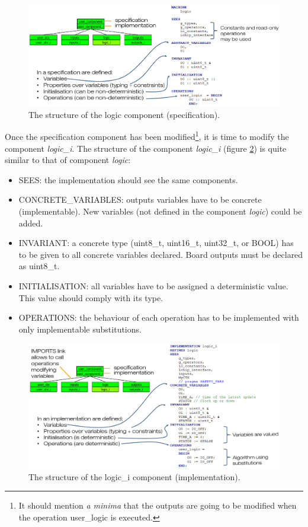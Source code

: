 \begin{figure}[ht]
\centering\includegraphics[scale=0.25]{Pictures/chapterProgramming/programming-spec.png}
\caption{The structure of the logic component (specification).}
\label{programming:spec}
\end{figure}
Once the specification component has been modified\footnote{It should mention \textit{a minima} that the outputs are going to be modified when the operation user\_logic is executed.}, it is time to modify the component \textit{logic\_i}. 
The structure of the component \textit{logic\_i} (figure \ref{programming:implem}) is quite similar to that of component \textit{logic}:
\begin{itemize}
    \item SEES: the implementation should see the same components.
    \item CONCRETE\_VARIABLES: outputs variables have to be concrete (implementable). New variables (not defined in the component \textit{logic}) could be added.
    \item INVARIANT: a concrete type (uint8\_t, uint16\_t, uint32\_t, or BOOL) has to be given to all concrete variables declared. Board outputs must be declared as uint8\_t.
    \item INITIALISATION: all variables have to be assigned a deterministic value. This value should comply with its type.
    \item OPERATIONS: the behaviour of each operation has to be implemented with only implementable substitutions.
\end{itemize}
\begin{figure}[ht]
\centering\includegraphics[scale=0.25]{Pictures/chapterProgramming/programming-implem.png}
\caption{The structure of the logic\_i component (implementation).}
\label{programming:implem}
\end{figure}  

